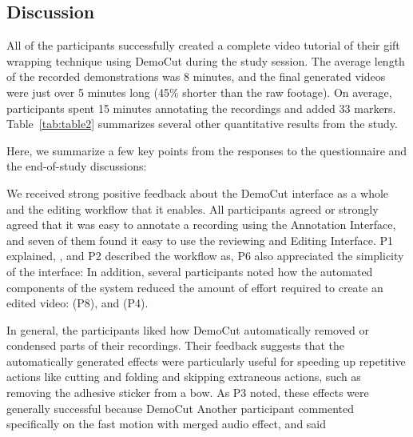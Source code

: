 \subsection{Discussion}
All of the participants successfully created a complete video tutorial
of their gift wrapping technique using DemoCut during the study
session. The average length of the recorded demonstrations was 8
minutes, and the final generated videos were just over 5 minutes long
(45\% shorter than the raw footage). On average, participants spent 15
minutes annotating the recordings and added 33
markers. Table~\ref{tab:table2} summarizes several other quantitative
results from the study.

Here, we summarize a few key points from the responses to the
questionnaire and the end-of-study discussions:

We received strong positive
feedback about the DemoCut interface as a whole and the editing
workflow that it enables. All participants agreed or strongly agreed that
it was easy to annotate a recording using the Annotation Interface, and seven
of them found it easy to use the reviewing and Editing Interface.
%
P1 explained, ,
and P2 described the workflow as, 
%
P6 also appreciated the simplicity of the interface: 
%
In addition, several participants noted how the automated components
of the system reduced the amount of effort required to create an
edited video:  (P8), and  (P4).

 In general, the participants
liked how DemoCut automatically removed or condensed parts of their
recordings. Their feedback suggests that the automatically generated
effects were particularly useful for speeding up repetitive actions
like cutting and folding and skipping extraneous actions, such as removing
the adhesive sticker from a bow. As P3 noted, these effects were generally successful because
DemoCut  Another participant commented specifically
on the fast motion with merged audio effect, and said  %

